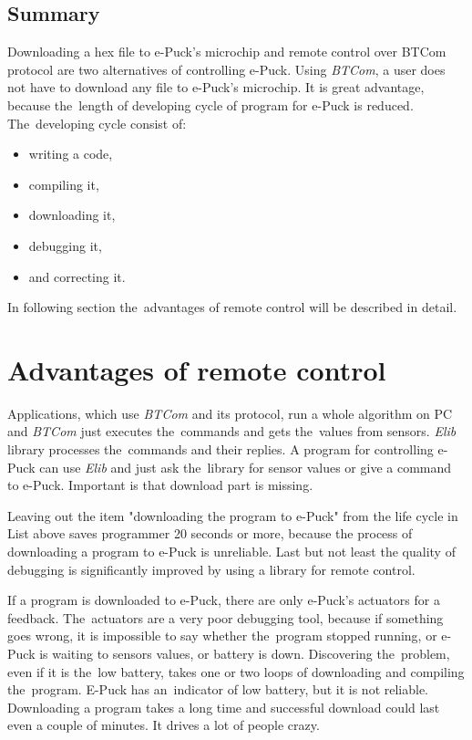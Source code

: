   \subsection*{Summary} %
  Downloading a hex file to e-Puck's microchip and remote control over BTCom protocol 
  are two alternatives of controlling e-Puck.
  Using {\it BTCom}, a user does not have to download any file to e-Puck's microchip.
  It is great advantage, because the~length of developing cycle of program for e-Puck is reduced.
  The~developing cycle consist of:
  \begin{itemize}
    \item writing a code,
    \item compiling it,
    \item downloading it,
    \item debugging it,  
    \item and correcting it.
  \end{itemize}
  In following section the~advantages of remote control will be described in detail.

\section{Advantages of remote control} \label{sec:remote}
  Applications, which use {\it BTCom} and its protocol, run a whole algorithm on PC and {\it BTCom} just 
  executes the~commands and gets the~values from sensors. {\it Elib} library processes the~commands
  and their replies. A program for controlling e-Puck can use {\it Elib} and just ask
  the~library for sensor values or give a command to e-Puck. 
  Important is that download part is missing.
   
  Leaving out the item "downloading the program to e-Puck" from the life cycle in List above saves programmer 
  20 seconds or more, because the process of downloading a program to e-Puck is unreliable.
  Last but not least the quality of debugging is significantly improved by using a library for remote control.

  If a program is downloaded to e-Puck, there are only e-Puck's actuators for a feedback.
  The~actuators are a very poor debugging tool, because if something goes wrong, 
  it is impossible to say whether the~program stopped running,
  or e-Puck is waiting to sensors values, or battery is down. 
  Discovering the~problem, even if it is the~low battery, takes one or two loops of downloading and compiling the~program.
  E-Puck has an~indicator of low battery, but it is not reliable.
  Downloading a program takes a long time and successful download could last even a couple of minutes. 
  It drives a lot of people crazy.
   
